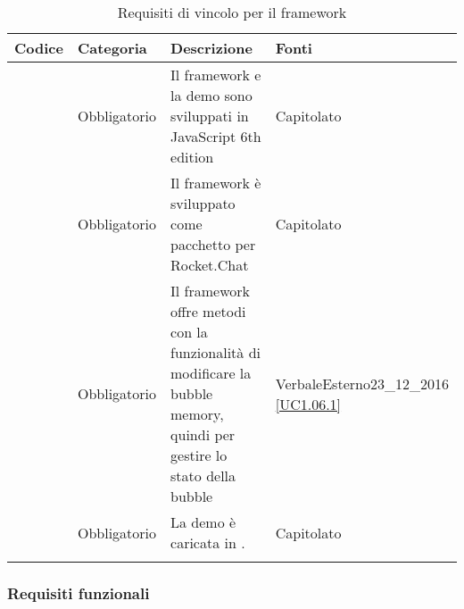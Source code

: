 \begin{longtable}{|P{1.5cm}|P{2.5cm}|P{6.5cm}|P{2.5cm}|}
	\hline \textbf{Codice} & \textbf{Categoria} & \textbf{Descrizione} & \textbf{Fonti} \\
	\hline \RequisitoObV\label{L1} & Obbligatorio & Il framework e la demo sono sviluppati in JavaScript 6th edition & Capitolato \\
	\hline \RequisitoObV \label{L2} & Obbligatorio & Il framework è sviluppato come pacchetto per Rocket.Chat & Capitolato \\
	\hline \RequisitoObV\label{L5} & Obbligatorio & Il framework offre metodi con la funzionalità di modificare la bubble memory, quindi per gestire lo stato della bubble & VerbaleEsterno23\_12\_2016 \linebreak \ref{UC1.06.1}  \\
	\hline \RequisitoObV\label{L54} & Obbligatorio & La demo è caricata in . & Capitolato \\
	\hline
	\caption{Requisiti di vincolo per il framework}
\end{longtable}

\subsubsection{Requisiti funzionali}

